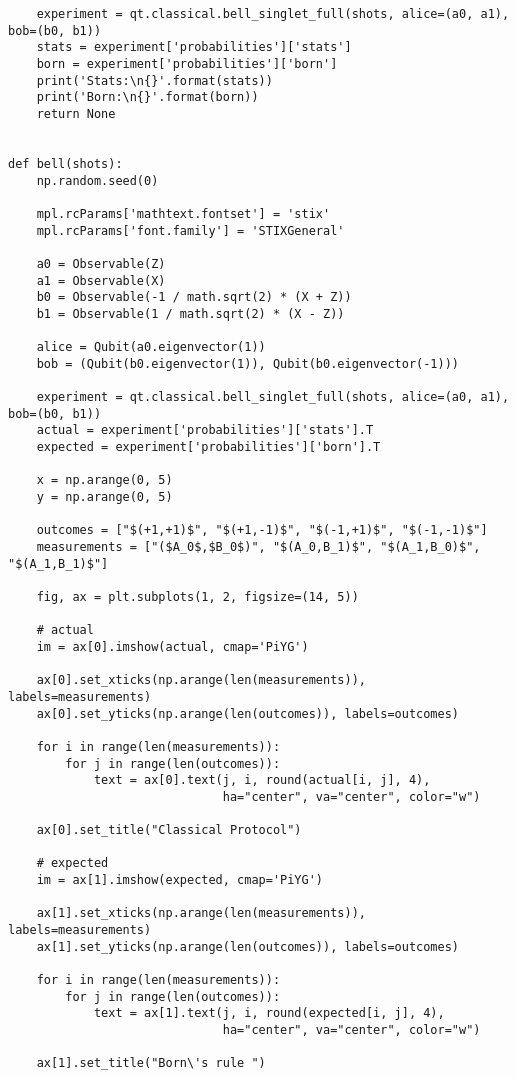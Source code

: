 \begin{verbatim}
    experiment = qt.classical.bell_singlet_full(shots, alice=(a0, a1), bob=(b0, b1))
    stats = experiment['probabilities']['stats']
    born = experiment['probabilities']['born']
    print('Stats:\n{}'.format(stats))
    print('Born:\n{}'.format(born))
    return None


def bell(shots):
    np.random.seed(0)

    mpl.rcParams['mathtext.fontset'] = 'stix'
    mpl.rcParams['font.family'] = 'STIXGeneral'

    a0 = Observable(Z)
    a1 = Observable(X)
    b0 = Observable(-1 / math.sqrt(2) * (X + Z))
    b1 = Observable(1 / math.sqrt(2) * (X - Z))

    alice = Qubit(a0.eigenvector(1))
    bob = (Qubit(b0.eigenvector(1)), Qubit(b0.eigenvector(-1)))

    experiment = qt.classical.bell_singlet_full(shots, alice=(a0, a1), bob=(b0, b1))
    actual = experiment['probabilities']['stats'].T
    expected = experiment['probabilities']['born'].T

    x = np.arange(0, 5)
    y = np.arange(0, 5)

    outcomes = ["$(+1,+1)$", "$(+1,-1)$", "$(-1,+1)$", "$(-1,-1)$"]
    measurements = ["($A_0$,$B_0$)", "$(A_0,B_1)$", "$(A_1,B_0)$", "$(A_1,B_1)$"]

    fig, ax = plt.subplots(1, 2, figsize=(14, 5))

    # actual
    im = ax[0].imshow(actual, cmap='PiYG')

    ax[0].set_xticks(np.arange(len(measurements)), labels=measurements)
    ax[0].set_yticks(np.arange(len(outcomes)), labels=outcomes)

    for i in range(len(measurements)):
        for j in range(len(outcomes)):
            text = ax[0].text(j, i, round(actual[i, j], 4),
                              ha="center", va="center", color="w")

    ax[0].set_title("Classical Protocol")

    # expected
    im = ax[1].imshow(expected, cmap='PiYG')

    ax[1].set_xticks(np.arange(len(measurements)), labels=measurements)
    ax[1].set_yticks(np.arange(len(outcomes)), labels=outcomes)

    for i in range(len(measurements)):
        for j in range(len(outcomes)):
            text = ax[1].text(j, i, round(expected[i, j], 4),
                              ha="center", va="center", color="w")

    ax[1].set_title("Born\'s rule ")


\end{verbatim}
